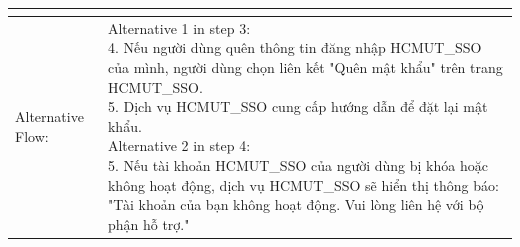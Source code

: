 \begin{table}[h!]
\begin{tabular}{ |p{4cm}|p{3cm}|p{3cm}|p{3cm}|  }
{		}                                                                                                                      \\
		\hline
		Alternative Flow: & \multicolumn{3}{p{10cm}|}{
			Alternative 1 in step 3:\newline
			4. Nếu người dùng quên thông tin đăng nhập HCMUT\_SSO của mình, người dùng chọn liên kết "Quên mật khẩu" trên trang HCMUT\_SSO.\newline
			5. Dịch vụ HCMUT\_SSO cung cấp hướng dẫn để đặt lại mật khẩu.\newline
			Alternative 2 in step 4:\newline
			5. Nếu tài khoản HCMUT\_SSO của người dùng bị khóa hoặc không hoạt động, dịch vụ HCMUT\_SSO sẽ hiển thị thông báo:
			"Tài khoản của bạn không hoạt động. Vui lòng liên hệ với bộ phận hỗ trợ."
		}                                                                                                                      \\
		\hline
	\end{tabular}
\end{table}
\newpage

